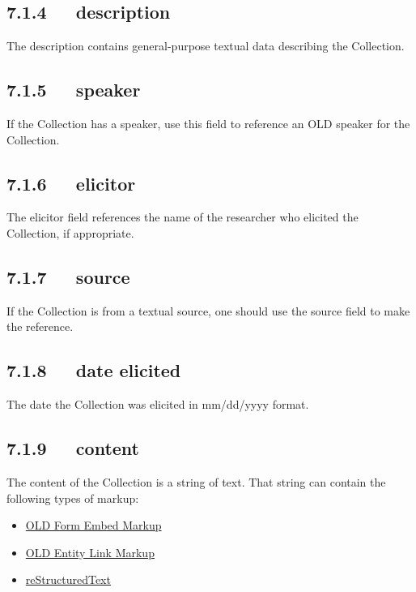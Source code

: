 \documentclass[letterpaper,10pt,english]{sphinxmanual}
\begin{document}
\subsection{7.1.4   description}
\label{documentation:id12}
The description contains general-purpose textual data describing the Collection.


\subsection{7.1.5   speaker}
\label{documentation:id13}
If the Collection has a speaker, use this field to reference an OLD speaker for
the Collection.


\subsection{7.1.6   elicitor}
\label{documentation:id14}
The elicitor field references the name of the researcher who elicited the
Collection, if appropriate.


\subsection{7.1.7   source}
\label{documentation:id15}
If the Collection is from a textual source, one should use the source field to
make the reference.


\subsection{7.1.8   date elicited}
\label{documentation:id16}
The date the Collection was elicited in mm/dd/yyyy format.


\subsection{7.1.9   content}
\label{documentation:content}
The content of the Collection is a string of text.  That string can contain the
following types of markup:
\begin{itemize}
\item {} 
{\hyperref[documentation:old-form-embed-markup]{OLD Form Embed Markup}}

\item {} 
{\hyperref[documentation:old-entity-link-markup]{OLD Entity Link Markup}}

\item {} 
{\hyperref[documentation:restructuredtext]{reStructuredText}}

\end{itemize}
\end{document}
